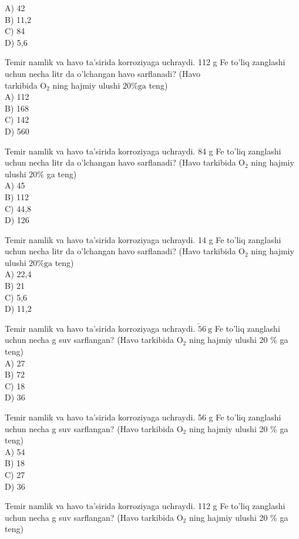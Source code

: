 A) 42\\
B) 11,2\\
C) 84\\
D) 5,6
  \item Temir namlik va havo ta'sirida korroziyaga uchraydi. 112 g Fe to'liq zanglashi uchun necha litr da o'lchangan havo sarflanadi? (Havo\\
tarkibida $\mathrm{O}_{2}$ ning hajmiy ulushi $20 \% \mathrm{ga}$ teng)\\
A) 112\\
B) 168\\
C) 142\\
D) 560
  \item Temir namlik va havo ta'sirida korroziyaga uchraydi. 84 g Fe to'liq zanglashi uchun necha litr da o'lchangan havo sarflanadi? (Havo tarkibida $\mathrm{O}_{2}$ ning hajmiy ulushi $20 \%$ ga teng)\\
A) 45\\
B) 112\\
C) 44,8\\
D) 126
  \item Temir namlik va havo ta'sirida korroziyaga uchraydi. 14 g Fe to'liq zanglashi uchun necha litr da o'lchangan havo sarflanadi? (Havo tarkibida $\mathrm{O}_{2}$ ning hajmiy ulushi $20 \% \mathrm{ga}$ teng)\\
A) 22,4\\
B) 21\\
C) 5,6\\
D) 11,2
  \item Temir namlik va havo ta'sirida korroziyaga uchraydi. $\check{5} 6 \mathrm{~g}$ Fe to'liq zanglashi uchun necha g suv sarflangan? (Havo tarkibida $\mathrm{O}_{2}$ ning hajmiy ulushi 20 \% ga teng)\\
A) 27\\
B) 72\\
C) 18\\
D) 36
  \item Temir namlik va havo ta'sirida korroziyaga uchraydi. 56 g Fe to'liq zanglashi uchun necha g suv sarflangan? (Havo tarkibida $\mathrm{O}_{2}$ ning hajmiy ulushi 20 \% ga teng)\\
A) 54\\
B) 18\\
C) 27\\
D) 36
  \item Temir namlik va havo ta'sirida korroziyaga uchraydi. 112 g Fe to'liq zanglashi uchun necha g suv sarflangan? (Havo tarkibida $\mathrm{O}_{2}$ ning hajmiy ulushi 20 \% ga teng)\\
